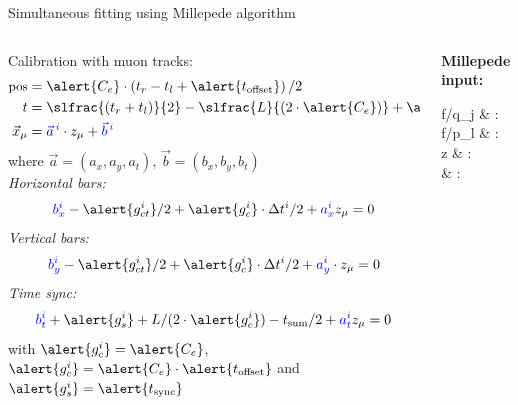 \documentclass{ikpKoeln}
\begin{document}
\begin{frame}[t]{Simultaneous fitting using Millepede algorithm}
	\begin{columns}[t]
		\begin{column}{0.48 \textwidth}
			\pause
			Calibration with muon tracks:
			\vspace*{-0.5em}
			\begin{align}
				\small
				\text{pos}  & = \alert{C_e}\cdot \left( t_r - t_l  + \alert{t_\text{offset}} \right) / 2            \\
				t           & = \slfrac{(t_r + t_l)}{2} - \slfrac{L}{(2 \cdot \alert{C_e})} + \alert{t_\text{sync}} \\
				\vec{x}_\mu & = \textcolor{blue}{\vec{a}^{\,i}} \cdot z_\mu  + \textcolor{blue}{\vec{b}^{\,i}}
			\end{align}
			{\scriptsize where $\vec{a} = (a_x, a_y, a_t)$, $\vec{b} = (b_x, b_y, b_t)$}\\

            \pause
			{\footnotesize
			{\textit{Horizontal bars:}}
			\vspace*{-0.5em}
			$$\textcolor{blue}{b^i_x} - \alert{g^i_{ct}} /2 + \alert{g^i_c} \cdot \Delta t^i / 2 + \textcolor{blue}{a^i_x} z_\mu         = 0 $$
			\textit{Vertical bars:}
			$$\textcolor{blue}{b^i_y} - \alert{g^i_{ct}} /2 + \alert{g^i_c} \cdot \Delta t^i / 2+ \textcolor{blue}{a^i_y} \cdot z_\mu = 0 $$
			\textit{Time sync:}
			$$\textcolor{blue}{b^i_t}  + \alert{g^i_s} + L / (2 \cdot \alert{g^i_c}) - t_\text{sum} / 2 + \textcolor{blue}{a^i_t} z_\mu  = 0 $$
			\vspace{-2em}
			with $\alert{g^i_{c}} = \alert{C_e}$, $\alert{g^i_{c}} = \alert{C_e} \cdot \alert{t_\text{offset}}$ and $\alert{g^i_s} = \alert{t_\text{sync}}$
			}
		\end{column}

		\begin{column}{0.48 \textwidth}
			\pause
			\textbf{Millepede input:}
			\vspace*{-0.5em}
			\begin{flalign*}
				\partial f/{\partial q_j} & :  \\
				\partial f/{\partial p_l} & :           \\
				z                         & :                   \\
				\sigma                    & : 
			\end{flalign*}


\end{column}
\end{columns}
\end{frame}
\end{document}
